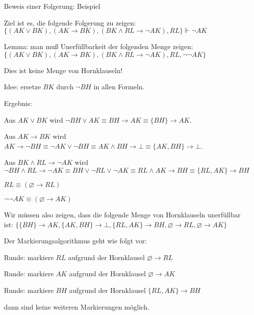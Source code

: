 \documentclass[a4paper]{article}
\begin{document}
\begin{multicols}{3}
  Beweis einer Folgerung: Beispiel
  \begin{itemize*}
    \item Ziel ist es, die folgende Folgerung zu zeigen: $\{(AK\vee BK),(AK\rightarrow BK),(BK\wedge RL\rightarrow\lnot AK),RL\}\Vdash\lnot AK$
    \item Lemma: man muß Unerfüllbarkeit der folgenden Menge zeigen: $\{(AK\vee BK),(AK\rightarrow BK),(BK\wedge RL\rightarrow \lnot AK),RL,\lnot\lnot AK\}$
    \item Dies ist keine Menge von Hornklauseln!
    \item Idee: ersetze $BK$ durch $\lnot BH$ in allen Formeln.
    \item Ergebnis:
    \begin{itemize*}
      \item Aus $AK\vee BK$ wird $\lnot BH\vee AK\equiv BH\rightarrow AK\equiv\{BH\}\rightarrow AK$.
      \item Aus $AK\rightarrow BK$ wird $AK\rightarrow\lnot BH\equiv\lnot AK\vee\lnot BH\equiv AK\wedge BH\rightarrow\bot\equiv\{AK,BH\} \rightarrow\bot$.
      \item Aus $BK\wedge RL\rightarrow\lnot AK$ wird $\lnot BH\wedge RL\rightarrow\lnot AK\equiv BH\vee\lnot RL\vee\lnot AK\equiv RL\wedge AK\rightarrow BH\equiv\{RL,AK\}\rightarrow BH$
      \item $RL\equiv (\varnothing\rightarrow RL)$
      \item $\lnot\lnot AK\equiv (\varnothing\rightarrow AK)$
    \end{itemize*}
    \item Wir müssen also zeigen, dass die folgende Menge von Hornklauseln unerfüllbar ist:
    $\{\{BH\}\rightarrow AK,\{AK,BH\}\rightarrow\bot,\{RL,AK\}\rightarrow BH,\varnothing\rightarrow RL,\varnothing\rightarrow AK\}$
  \end{itemize*}

  Der Markierungsalgorithmus geht wie folgt vor:
  \begin{enumerate*}
    \item Runde: markiere $RL$ aufgrund der Hornklausel $\varnothing\rightarrow RL$
    \item Runde: markiere $AK$ aufgrund der Hornklausel $\varnothing\rightarrow AK$
    \item Runde: markiere $BH$ aufgrund der Hornklausel $\{RL,AK\}\rightarrow BH$
    \item dann sind keine weiteren Markierungen möglich.
  \end{enumerate*}


\end{multicols}
\end{document}
